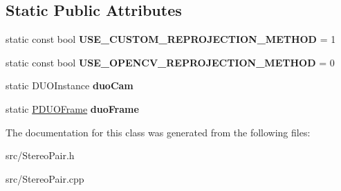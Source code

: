 \subsection*{Static Public Attributes}
\begin{DoxyCompactItemize}
\item 
static const bool {\bfseries U\+S\+E\+\_\+\+C\+U\+S\+T\+O\+M\+\_\+\+R\+E\+P\+R\+O\+J\+E\+C\+T\+I\+O\+N\+\_\+\+M\+E\+T\+H\+OD} = 1\hypertarget{class_stereo_pair_a7e1374e6fb71930e81e015674c213d1c}{}\label{class_stereo_pair_a7e1374e6fb71930e81e015674c213d1c}

\item 
static const bool {\bfseries U\+S\+E\+\_\+\+O\+P\+E\+N\+C\+V\+\_\+\+R\+E\+P\+R\+O\+J\+E\+C\+T\+I\+O\+N\+\_\+\+M\+E\+T\+H\+OD} = 0\hypertarget{class_stereo_pair_a3219602abfed004646ca7d3257b1d3d1}{}\label{class_stereo_pair_a3219602abfed004646ca7d3257b1d3d1}

\item 
static D\+U\+O\+Instance {\bfseries duo\+Cam}\hypertarget{class_stereo_pair_a3694a2dbad1dcc60f4bc2c8e0d17b132}{}\label{class_stereo_pair_a3694a2dbad1dcc60f4bc2c8e0d17b132}

\item 
static \hyperlink{struct_d_u_o_frame}{P\+D\+U\+O\+Frame} {\bfseries duo\+Frame}\hypertarget{class_stereo_pair_a4af1dcd18d281023699e9929a219a299}{}\label{class_stereo_pair_a4af1dcd18d281023699e9929a219a299}

\end{DoxyCompactItemize}


The documentation for this class was generated from the following files\+:\begin{DoxyCompactItemize}
\item 
src/Stereo\+Pair.\+h\item 
src/Stereo\+Pair.\+cpp\end{DoxyCompactItemize}
